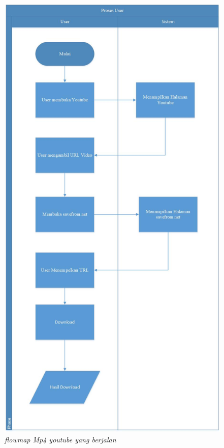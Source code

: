 \begin{figure}[!htbp]
    \centering
    \includegraphics[scale=0.6]{figure/Drawing2.jpg}
    \caption{\textit{flowmap Mp4 youtube yang berjalan }}
    \label{gambar 1}
\end{figure}

